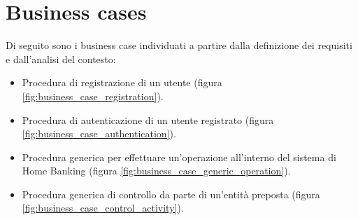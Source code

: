 \documentclass[10pt]{softeng} %
\begin{document}
\startofdocument{}







\section{Business cases}

Di seguito sono i business case individuati a partire dalla definizione dei requisiti e dall'analisi del contesto:
\begin{itemize}
	\item Procedura di registrazione di un utente (figura \ref{fig:business_case_registration}).
	\item Procedura di autenticazione di un utente registrato (figura \ref{fig:business_case_authentication}).
	\item Procedura generica per effettuare un'operazione all'interno del sistema di Home Banking (figura \ref{fig:business_case_generic_operation}).
	\item Procedura generica di controllo da parte di un'entit\`a preposta (figura \ref{fig:business_case_control_activity}).
\end{itemize}
\end{document}
